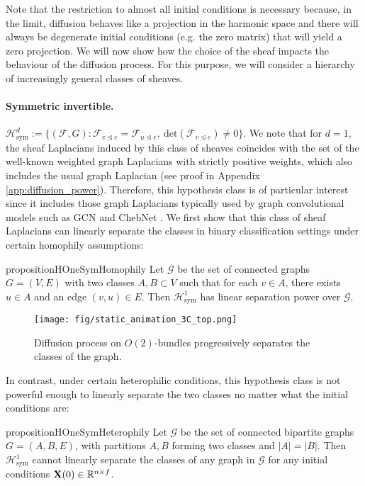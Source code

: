 \documentclass{article}
\def\mX{{\bf{X}}}
\def\gF{{\mathcal{F}}}
\def\gG{{\mathcal{G}}}
\def\gH{{\mathcal{H}}}
\def\sR{{\mathbb{R}}}
\newcommand{\tleq}{\trianglelefteq}
\begin{document}
Note that the restriction to almost all initial conditions is necessary because, in the limit, diffusion behaves like a projection in the harmonic space and there will always be degenerate initial conditions (e.g. the zero matrix) that will yield a zero projection. We will now show how the choice of the sheaf impacts the behaviour of the diffusion process. For this purpose, we will consider a hierarchy of increasingly general classes of sheaves. 
\paragraph*{Symmetric invertible.} 
$\gH_{\mathrm{sym}}^d := \{ (\gF, G) : \gF_{v \tleq e} = \gF_{u \tleq e},\ \mathrm{det}(\gF_{v \tleq e}) \neq 0 \}$.
We note that for $d=1$, the sheaf Laplacians induced by this class of sheaves coincides with the set of the well-known weighted graph Laplacians with strictly positive weights, which also includes the usual graph Laplacian (see proof in Appendix \ref{app:diffusion_power}). Therefore, this hypothesis class is of particular interest since it includes those graph Laplacians typically used by graph convolutional models such as GCN \citep{kipf2017graph} and ChebNet \citep{defferrard2016convolutional}. We first show that this class of sheaf Laplacians can linearly separate the classes in binary classification settings under certain homophily assumptions:

\begin{restatable}{proposition}{HOneSymHomophily}\label{prop:h1_sym_homophily}
Let $\gG$ be the set of connected graphs $G = (V, E)$ with two classes $A, B \subset V$ such that for each $v \in A$, there exists $u \in A$ and an edge $(v, u) \in E$. Then $\gH_{\mathrm{sym}}^1$ has linear separation power over $\gG$.  
\end{restatable}

\begin{figure}[t]
    \centering
    \texttt{[image: fig/static\_animation\_3C\_top.png]}
    \caption{Diffusion process on $O(2)$-bundles progressively separates the classes of the graph.}
    \vspace{-15pt} 
    \label{fig:d2_diff}
\end{figure}

In contrast, under certain heterophilic conditions, this hypothesis class is not powerful enough to linearly separate the two classes no matter what the initial conditions are: 

\begin{restatable}{proposition}{HOneSymHeterophily}\label{prop:h1_sym_heterophily}
Let $\gG$ be the set of connected bipartite graphs $G = (A, B, E)$, with partitions $A, B$ forming two classes and $|A| = |B|$. Then  $\gH_{\mathrm{sym}}^1$ cannot linearly separate the classes of any graph in $\gG$ for any initial conditions $\mX(0) \in \sR^{n \times f}$.  
\end{restatable}
\end{document}
